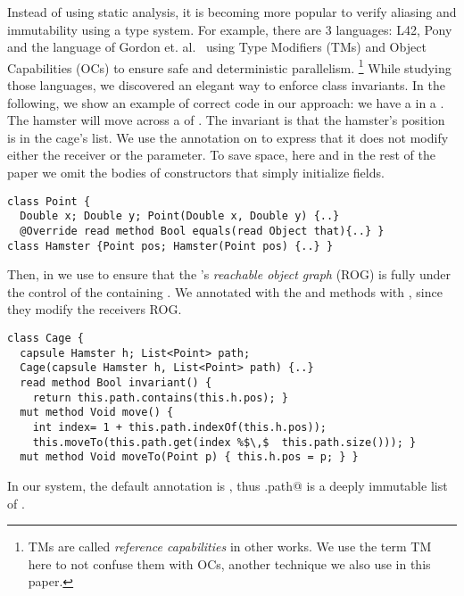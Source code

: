 Instead of using static analysis, 
it is becoming more popular to verify aliasing and immutability using a type system.
For example, there are 3 languages: L42, Pony and the language of Gordon et. al.~\cite{?}
using Type Modifiers (TMs) and Object Capabilities (OCs) to ensure safe and deterministic parallelism.%
\footnote{TMs are called \emph{reference capabilities} in other works. We use the term TM here
to not confuse them with OCs, another technique we also use in this paper.}
While studying those languages, we discovered an elegant way to enforce class invariants.
In the following, we show an example of correct code in our approach: we have a \Q@Hamster@ in a \Q@Cage@.
The hamster will move across a \Q@List@ of \Q@Point@s.
The invariant is that the hamster's position is in the cage's list.
We use the \Q@read@ annotation on \Q@equals@ to express that it does not modify either the
receiver or the parameter.
To save space, here and in the rest of the paper we omit the bodies of constructors that simply initialize fields.
\begin{lstlisting}
class Point {
  Double x; Double y; Point(Double x, Double y) {..}
  @Override read method Bool equals(read Object that){..} }
class Hamster {Point pos; Hamster(Point pos) {..} }
\end{lstlisting}
Then, in \Q@Cage@
we use \Q@capsule@ to ensure
that the \Q@Hamster@'s \emph{reachable object graph} (ROG) is fully under the control
of the containing \Q@Cage@.
We annotated with the \Q@move@
and \Q@moveTo@ methods with \Q@mut@, since they modify
the receivers ROG.
\begin{lstlisting}
class Cage {
  capsule Hamster h; List<Point> path;
  Cage(capsule Hamster h, List<Point> path) {..}
  read method Bool invariant() {
    return this.path.contains(this.h.pos); }
  mut method Void move() {
    int index= 1 + this.path.indexOf(this.h.pos));
    this.moveTo(this.path.get(index %$\,$  this.path.size())); }
  mut method Void moveTo(Point p) { this.h.pos = p; } }
\end{lstlisting}
In our system, the default annotation is \Q@imm@, thus \Q@Cage.path@ is a deeply immutable list of \Q@Point@s.


